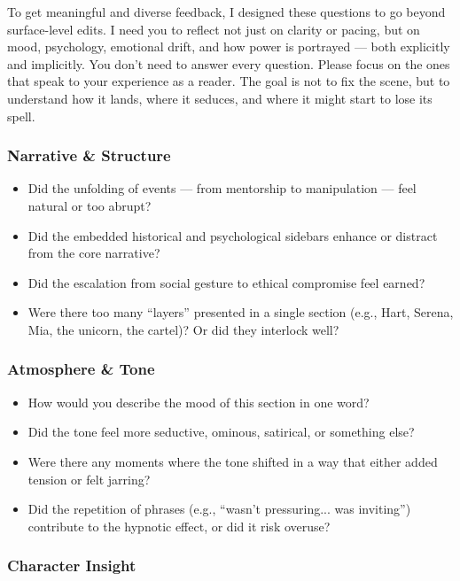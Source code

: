 To get meaningful and diverse feedback, I designed these questions to go beyond surface-level edits.
I need you to reflect not just on clarity or pacing, but on mood, psychology, emotional drift, and how power is portrayed — both explicitly and implicitly.
You don’t need to answer every question. Please focus on the ones that speak to your experience as a reader. The goal is not to fix the scene,
but to understand how it lands, where it seduces, and where it might start to lose its spell.

\subsubsection{Narrative \& Structure}

\begin{itemize}
\item Did the unfolding of events — from mentorship to manipulation — feel natural or too abrupt?
\item Did the embedded historical and psychological sidebars enhance or distract from the core narrative?
\item Did the escalation from social gesture to ethical compromise feel earned?
\item Were there too many “layers” presented in a single section (e.g., Hart, Serena, Mia, the unicorn, the cartel)? Or did they interlock well?
\end{itemize}

\subsubsection{Atmosphere \& Tone}

\begin{itemize}
\item How would you describe the mood of this section in one word?
\item Did the tone feel more seductive, ominous, satirical, or something else?
\item Were there any moments where the tone shifted in a way that either added tension or felt jarring?
\item Did the repetition of phrases (e.g., “wasn’t pressuring... was inviting”) contribute to the hypnotic effect, or did it risk overuse?
\end{itemize}

\subsubsection{Character Insight}

